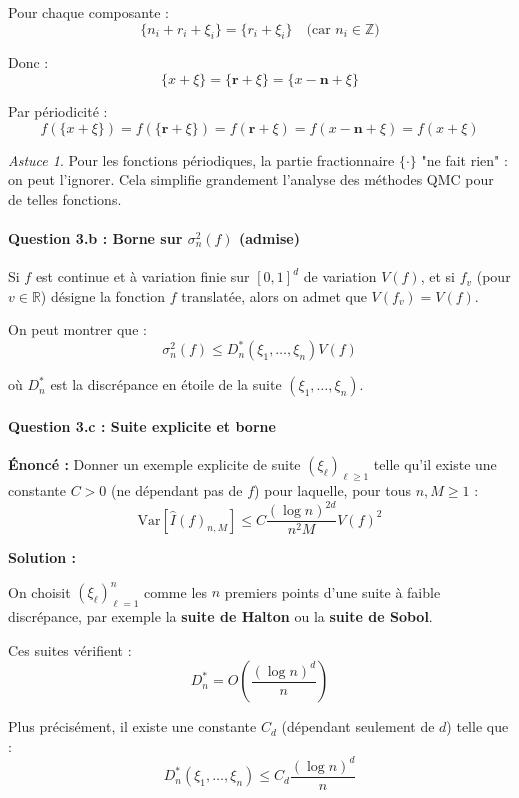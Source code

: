 \documentclass[12pt,a4paper]{article}
\theoremstyle{definition}
\theoremstyle{remark}
\newtheorem*{astuce}{Astuce}
\newcommand{\R}{\mathbb{R}}
\newcommand{\Var}{\text{Var}}
\begin{document}
Pour chaque composante :
\[
\{n_i + r_i + \xi_i\} = \{r_i + \xi_i\} \quad \text{(car } n_i \in \mathbb{Z}\text{)}
\]

Donc :
\[
\{x + \xi\} = \{\mathbf{r} + \xi\} = \{x - \mathbf{n} + \xi\}
\]

Par périodicité :
\[
f(\{x + \xi\}) = f(\{\mathbf{r} + \xi\}) = f(\mathbf{r} + \xi) = f(x - \mathbf{n} + \xi) = f(x + \xi)
\]

\begin{astuce}
Pour les fonctions périodiques, la partie fractionnaire $\{\cdot\}$ "ne fait rien" : on peut l'ignorer. Cela simplifie grandement l'analyse des méthodes QMC pour de telles fonctions.
\end{astuce}

\paragraph{Question 3.b : Borne sur $\sigma_n^2(f)$ (admise)}

Si $f$ est continue et à variation finie sur $[0,1]^d$ de variation $V(f)$, et si $f_v$ (pour $v \in \R$) désigne la fonction $f$ translatée, alors on admet que $V(f_v) = V(f)$.

On peut montrer que :
\[
\boxed{\sigma_n^2(f) \leq D_n^*(\xi_1, \ldots, \xi_n) V(f)}
\]

où $D_n^*$ est la discrépance en étoile de la suite $(\xi_1, \ldots, \xi_n)$.

\paragraph{Question 3.c : Suite explicite et borne}

\textbf{Énoncé :} Donner un exemple explicite de suite $(\xi_\ell)_{\ell \geq 1}$ telle qu'il existe une constante $C > 0$ (ne dépendant pas de $f$) pour laquelle, pour tous $n, M \geq 1$ :
\[
\Var[\hat{I}(f)_{n,M}] \leq C\frac{(\log n)^{2d}}{n^2 M} V(f)^2
\]

\textbf{Solution :}

On choisit $(\xi_\ell)_{\ell=1}^n$ comme les $n$ premiers points d'une suite à faible discrépance, par exemple la \textbf{suite de Halton} ou la \textbf{suite de Sobol}.

Ces suites vérifient :
\[
D_n^* = O\left(\frac{(\log n)^d}{n}\right)
\]

Plus précisément, il existe une constante $C_d$ (dépendant seulement de $d$) telle que :
\[
D_n^*(\xi_1, \ldots, \xi_n) \leq C_d \frac{(\log n)^d}{n}
\]
\end{document}
